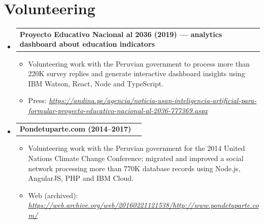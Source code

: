 \documentclass[letterpaper,11pt]{article}
\makeatletter
\newcommand{\resumeItem}[1]{
  \item\small{
    {#1 \vspace{-2pt}}
  }
}
\newcommand{\resumeProjectHeading}[2]{
    \vspace{-2pt}\item
    \begin{tabular*}{0.97\textwidth}{l@{\extracolsep{\fill}}r}
      \small#1 & #2 \\
    \end{tabular*}\vspace{-7pt}
}
\newcommand{\resumeSubHeadingListStart}{\begin{itemize}[leftmargin=0.15pt, label={}]}
\newcommand{\resumeSubHeadingListEnd}{\end{itemize}}
\newcommand{\resumeItemListStart}{\begin{itemize}}
\newcommand{\resumeItemListEnd}{\end{itemize}\vspace{-5pt}}
\makeatother
\begin{document}

\section{Volunteering}
    \vspace{3pt}
    \resumeSubHeadingListStart

      \resumeProjectHeading
        {\textbf{Proyecto Educativo Nacional al 2036 (2019) --- analytics dashboard about education indicators}}{}
          \resumeItemListStart
            \resumeItem{Volunteering work with the Peruvian government to process more than 220K survey replies and generate interactive dashboard insights using IBM Watson, React, Node and TypeScript.}
            \resumeItem{Press: \emph{\href{https://andina.pe/agencia/noticia-usan-inteligencia-artificial-para-formular-proyecto-educativo-nacional-al-2036-777369.aspx}{\color{blue}https://andina.pe/agencia/noticia-usan-inteligencia-artificial-para-formular-proyecto-educativo-nacional-al-2036-777369.aspx}}}
          \resumeItemListEnd

      \resumeProjectHeading
        {\textbf{Pondetuparte.com (2014--2017)}}{}
          \resumeItemListStart
            \resumeItem{Volunteering work with the Peruvian government for the 2014 United Nations Climate Change Conference; migrated and improved a social network processing more than 770K database records using Node.js, AngularJS, PHP and IBM Cloud.}
            \resumeItem{Web (archived): \emph{\href{https://web.archive.org/web/20160221121538/http://www.pondetuparte.com/}{\color{blue}https://web.archive.org/web/20160221121538/http://www.pondetuparte.com/}}}
          \resumeItemListEnd

    \resumeSubHeadingListEnd
\end{document}
